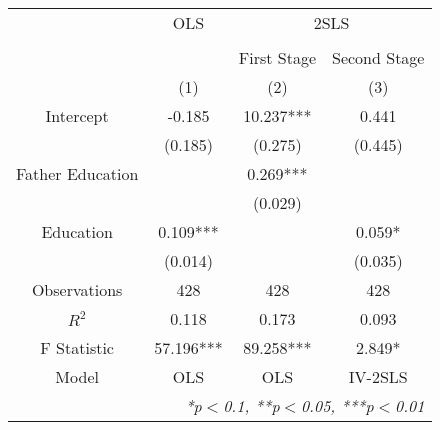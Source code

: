 \begin{tabular}{cccc}
  \toprule
  \toprule
  & \multicolumn{1}{c}{OLS} & \multicolumn{2}{c}{2SLS} \\
  \cmidrule(lr){2-2}\cmidrule(lr){3-4} \\
  & \multicolumn{1}{c}{} & \multicolumn{1}{c}{First Stage} & \multicolumn{1}{c}{Second Stage} \\
   & (1) & (2) & (3)\\
  \midrule
  Intercept & -0.185 & 10.237*** & 0.441 \\
   & (0.185) & (0.275) & (0.445) \\
  Father Education &  & 0.269*** &  \\
   &  & (0.029) &  \\
  Education & 0.109*** &  & 0.059* \\
   & (0.014) &  & (0.035) \\
  \midrule
  Observations & 428 & 428 & 428 \\
  $R^2$ & 0.118 & 0.173 & 0.093 \\
  F Statistic & 57.196*** & 89.258*** & 2.849* \\
  Model & OLS & OLS & IV-2SLS \\
  \bottomrule
  \multicolumn{4}{r}{{\small \textit{*p$<$0.1, **p$<$0.05, ***p$<$0.01}}}\\
\end{tabular}
